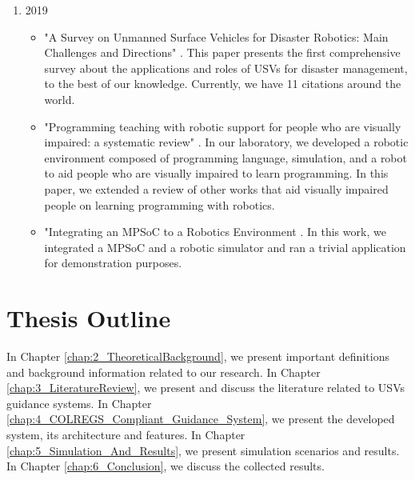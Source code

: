     \begin{enumerate}
        \item 2019
            \begin{itemize}
                \item "A Survey on Unmanned Surface Vehicles for Disaster Robotics: Main Challenges and Directions" \cite{Jorge2019Survey}. This paper presents the first comprehensive survey about the applications and roles of \acp{USV} for disaster management, to the best of our knowledge. Currently, we have 11 citations around the world.
                \item "Programming teaching with robotic support for people who are visually impaired: a systematic review" \cite{Damasio2019Programming}. In our laboratory, we developed a robotic environment composed of programming language, simulation, and a robot to aid people who are visually impaired to learn programming. In this paper, we extended a review of other works that aid visually impaired people on learning programming with robotics.
                \item "Integrating an MPSoC to a Robotics Environment \cite{Domingues2019Integrating}. In this work, we integrated a \ac{MPSoC} and a robotic simulator and ran a trivial application for demonstration purposes.
            \end{itemize}
    \end{enumerate}
    
    \section{Thesis Outline}
    
    In Chapter \ref{chap:2_TheoreticalBackground}, we present important definitions and background information related to our research. In Chapter \ref{chap:3_LiteratureReview}, we present and discuss the literature related to \acp{USV} guidance systems. 
    In Chapter \ref{chap:4_COLREGS_Compliant_Guidance_System}, we present the developed system, its architecture and features. In Chapter \ref{chap:5_Simulation_And_Results}, we present simulation scenarios and results. In Chapter \ref{chap:6_Conclusion}, we discuss the collected results.
    